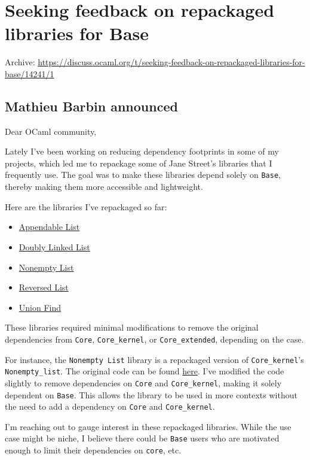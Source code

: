\documentclass[11pt]{article}
\begin{document}
\section*{Seeking feedback on repackaged libraries for Base}
\label{12}
Archive: \url{https://discuss.ocaml.org/t/seeking-feedback-on-repackaged-libraries-for-base/14241/1}
\subsection*{Mathieu Barbin announced}
\label{sec:org6ef0ce0}


Dear OCaml community,

Lately I've been working on reducing dependency footprints in some of my projects, which led me to repackage some
of Jane Street's libraries that I frequently use. The goal was to make these libraries depend solely on \texttt{Base},
thereby making them more accessible and lightweight.

Here are the libraries I've repackaged so far:

\begin{itemize}
\item \href{https://github.com/mbarbin/appendable-list}{Appendable List}
\item \href{https://github.com/mbarbin/doubly-linked}{Doubly Linked List}
\item \href{https://github.com/mbarbin/nonempty-list}{Nonempty List}
\item \href{https://github.com/mbarbin/reversed-list}{Reversed List}
\item \href{https://github.com/mbarbin/union-find}{Union Find}
\end{itemize}

These libraries required minimal modifications to remove the original dependencies from \texttt{Core}, \texttt{Core\_kernel}, or
\texttt{Core\_extended}, depending on the case.

For instance, the \texttt{Nonempty List} library is a repackaged version of \texttt{Core\_kernel}'s \texttt{Nonempty\_list}. The original
code can be found \href{https://github.com/janestreet/core\_kernel/tree/master/nonempty\_list}{here}. I've modified the
code slightly to remove dependencies on \texttt{Core} and \texttt{Core\_kernel}, making it solely dependent on \texttt{Base}. This allows
the library to be used in more contexts without the need to add a dependency on \texttt{Core} and \texttt{Core\_kernel}.

I'm reaching out to gauge interest in these repackaged libraries. While the use case might be niche, I believe
there could be \texttt{Base} users who are motivated enough to limit their dependencies on \texttt{core}, etc.
\end{document}
